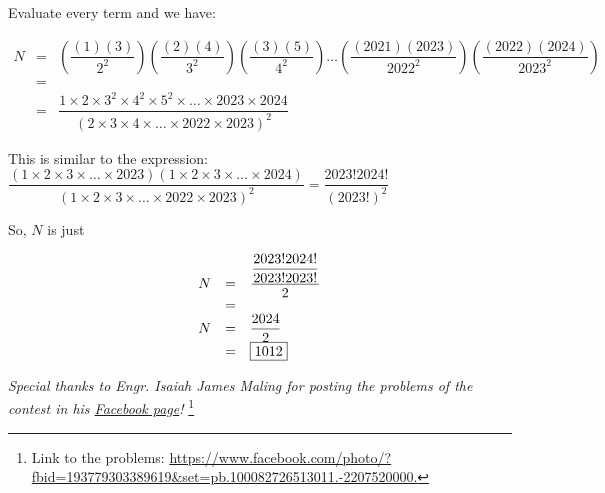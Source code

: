 \documentclass[11pt,paper={letter}]{scrartcl}
\begin{document}
\begin{enumerate}[label=\textbf{\arabic*}.]

\sol Evaluate every term and we have:

\begin{equation*}
    \begin{array}{rcl}
         N &  = & \left(\dfrac{(1)(3)}{2^2}\right)\left(\dfrac{(2)(4)}{3^2}\right)\left(\dfrac{(3)(5)}{4^2}\right)\ldots\left(\dfrac{(2021)(2023)}{2022^2}\right)\left(\dfrac{(2022)(2024)}{2023^2}\right)\\

         & = & \\

         & = & \dfrac{1 \times 2 \times 3^2 \times 4^2 \times 5^2 \times \ldots \times 2023 \times 2024 }{(2\times 3 \times 4 \times \ldots \times 2022 \times 2023)^2}
    \end{array}
\end{equation*}

This is similar to the expression: $\dfrac{(1 \times 2 \times 3 \times \ldots \times 2023)(1 \times 2 \times 3 \times \ldots \times 2024)}{(1\times 2\times 3 \times \ldots \times 2022 \times 2023)^2} = \dfrac{2023! 2024!}{(2023!)^2}$

So, $N$ is just 

\begin{equation*}
    \begin{array}{rcl}

         N & = & \dfrac{\dfrac{2023!2024!}{2023!2023!}}{2}\\

         &=& \\

          N & = & \dfrac{2024}{2}\\

          & = & \fbox{1012}\\
    \end{array}
\end{equation*}
\end{enumerate}

\emph{Special thanks to Engr. Isaiah James Maling for posting the problems of the contest in his \href{https://www.facebook.com/photo/?fbid=193779303389619&set=pb.100082726513011.-2207520000.}{Facebook page}!} \footnote{Link to the problems: \url{https://www.facebook.com/photo/?fbid=193779303389619&set=pb.100082726513011.-2207520000.}}
\end{document}
